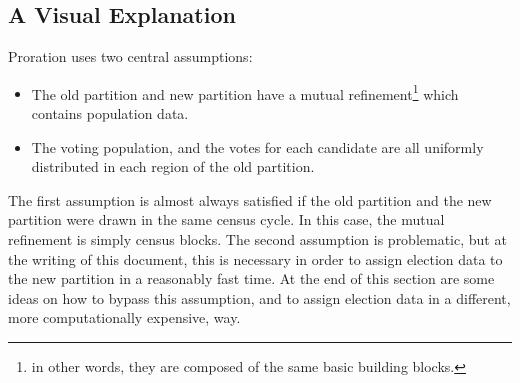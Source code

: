 \subsection{A Visual Explanation}
Proration uses two central assumptions:
\begin{itemize}
  \item The old partition and new partition have a mutual 
    refinement\footnote{in other words, they are 
    composed of the same basic building blocks.} 
    which contains population data.
  \item The voting population, and the votes for each candidate 
    are all uniformly distributed in each region of 
    the old partition.
\end{itemize}
The first assumption is almost always satisfied if the old partition 
and the new partition were drawn in the same census cycle. In this 
case, the mutual refinement is simply census blocks. The second assumption 
is problematic, but at the writing of this document, this 
is necessary in order to assign election data to the new 
partition in a reasonably fast time. At the end of this 
section are some ideas on how to bypass this assumption, and to 
assign election data in a different, more computationally 
expensive, way.

